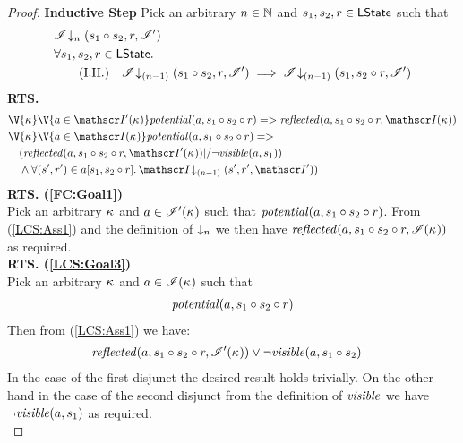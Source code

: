 \begin{lemma}
\begin{proof}
\noindent\textbf{Inductive Step} Pick an arbitrary $n \in \mathbb{N}$ and $s_1, s_2, r \in \textsf{LState}$ such that
%
\begin{align}
	& \extendsAMUpto{\lmod}{n}{s_1 \composeL s_2}{r}{\lmod'} \label{LCS:Ass1}\\
%
	&	\for{s_1, s_2, r \in \LStates} \nonumber \\	
	& \tag{I.H.} \quad\extendsAMUpto{\lmod}{(n-1)}{s_1 \composeL s_2}{r}{\lmod'} \implies 
										\extendsAMUpto{\lmod}{(n-1)}{s_1}{s_2 \composeL r}{\lmod'} \label{LCS:IH}
\end{align}
%
\textbf{RTS. }
%
\begin{align}
	&\V{\ca{}}\V{a\in \lmod'(\ca{})} \m{potential}(a,s_1 \composeL s_2 \composeL r) => \m{reflected}(a, s_1 \composeL s_2 \composeL r, \lmod(\ca{}))\label{FC:Goal1}\\
  &\V{\ca{}}\V{a\in \lmod(\ca{})} 
  \m{potential}(a,s_1 \composeL s_2 \composeL r) =>\null \nonumber \\
  &\quad 
		(\m{reflected}(a,s_1 \composeL s_2 \composeL r,\lmod'(\ca{})) 
		|/ \neg\m{visible}(a,s_1)) 	 \label{LCS:Goal3} \\
%  
	& \quad\land  \for{(s', r') \in a[s_1, s_2 \composeL r]} \extendsAMUpto{\lmod}{(n-1)}{s'}{r'}{\lmod'}) \label{LCS:Goal4}
%
\end{align}
%
%
%
%
%
\noindent\textbf{RTS. (\ref{FC:Goal1})} \\
Pick an arbitrary $\kappa_{}$ and $a \in \mathscr{I}'(\kappa_{})$ such that $\mathit{potential}(a, s_1 \circ s_2 \circ r)$. From (\ref{LCS:Ass1}) and the definition of $\downarrow_n$ we then have $\mathit{reflected}(a, s_1 \circ s_2 \circ r, \mathscr{I}(\kappa_{}))$ as required.\\

\noindent\textbf{RTS. (\ref{LCS:Goal3})}\\
Pick an arbitrary $\kappa_{}$ and $a \in \mathscr{I}(\kappa_{})$ such that 
\begin{align*}
	\mathit{potential}(a, s_1 \circ s_2 \circ r)
\end{align*}
Then from (\ref{LCS:Ass1}) we have: 
%
\begin{align*}
	& \mathit{reflected}(a,s_1 \circ s_2 \circ r,\mathscr{I}'(\kappa_{})) 
	\lor \neg\mathit{visible}(a,s_1 \circ s_2) 
\end{align*}
%
In the case of the first disjunct the desired result holds trivially. On the other hand in the case of the second disjunct from the definition of $\mathit{visible}$ we have $\neg\mathit{visible}(a, s_1)$ as required.\\


\end{proof}
\end{lemma}
